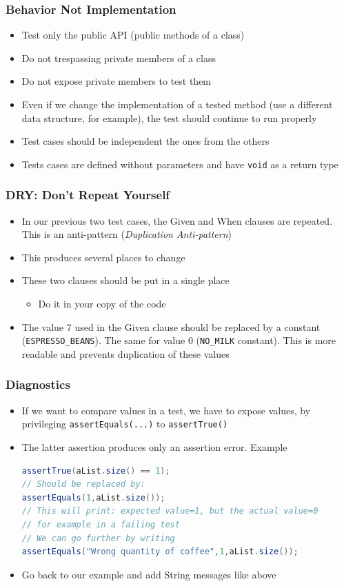 \documentclass{beamer}
\begin{document}
\begin{frame}
\frametitle{Behavior Not Implementation}
\begin{itemize}
\item Test only the public API (public methods of a class)
\item Do not trespassing private members of a class
\item Do not expose private members to test them  
\item Even if we change the implementation of a tested method (use a
  different data structure, for example), the test should continue to
  run properly
\item Test cases should be independent the ones from the others
\item Tests cases are defined without parameters and have
  \texttt{void} as a return type
\end{itemize}
\end{frame}

\begin{frame}
\frametitle{DRY: Don't Repeat Yourself}
\begin{itemize}
\item In our previous two test cases, the Given and When clauses are
  repeated. This is an anti-pattern (\textit{Duplication
    Anti-pattern})
\item This produces several places to change
\item These two clauses should be put in a single place
  \begin{itemize}
  \item  Do it in your copy of the code
  \end{itemize}
\item The value 7 used in the Given clause should be replaced by a
  constant (\texttt{ESPRESSO\_BEANS}). The same for value 0
  (\texttt{NO\_MILK} constant). This is more readable and prevents
  duplication of these values
\end{itemize}
\end{frame}

\begin{frame}[fragile]
\frametitle{Diagnostics}
\begin{itemize}
\item If we want to compare values in a test, we have to expose
  values, by privileging \texttt{assertEquals(...)} to
  \texttt{assertTrue()}
\item The latter assertion produces only an assertion error. Example
\begin{lstlisting}[language=JAVA]
assertTrue(aList.size() == 1);
// Should be replaced by:
assertEquals(1,aList.size());
// This will print: expected value=1, but the actual value=0
// for example in a failing test
// We can go further by writing
assertEquals("Wrong quantity of coffee",1,aList.size());
\end{lstlisting}
\item Go back to our example and add String messages like above
\end{itemize}
\end{frame}
\end{document}
